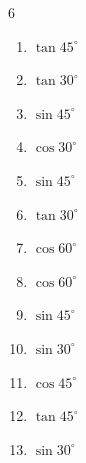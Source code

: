 \begin{multicols}{6}
\begin{enumerate}
  \item $\displaystyle \tan{45^\circ}$

        \phantom{$\displaystyle =1$}

  \item $\displaystyle \tan{30^\circ}$


  \item $\displaystyle \sin{45^\circ}$


  \item $\displaystyle \cos{30^\circ}$


  \item $\displaystyle \sin{45^\circ}$


  \item $\displaystyle \tan{30^\circ}$


  \item $\displaystyle \cos{60^\circ}$


  \item $\displaystyle \cos{60^\circ}$


  \item $\displaystyle \sin{45^\circ}$


  \item $\displaystyle \sin{30^\circ}$


\columnbreak %

  \item $\displaystyle \cos{45^\circ}$


  \item $\displaystyle \tan{45^\circ}$

        \phantom{$\displaystyle =1$}

  \item $\displaystyle \sin{30^\circ}$


\end{enumerate}
\end{multicols}
